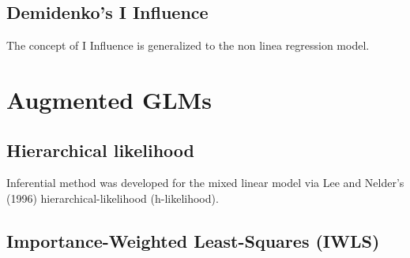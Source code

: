 \documentclass[12pt, a4paper]{report}
\theoremstyle{plain}
\theoremstyle{definition}
\theoremstyle{remark}
\begin{document}
\section{Demidenko's I Influence} %
The concept of I Influence is generalized  to the non linea regression model.


\chapter{Augmented GLMs}





\section{Hierarchical likelihood} %
Inferential method was developed for the mixed linear model via Lee and Nelder's (1996) hierarchical-likelihood (h-likelihood).

\section{Importance-Weighted Least-Squares (IWLS)}  %



\end{document}
